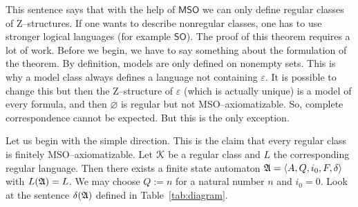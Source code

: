 This sentence says that with the help of $\mathsf{MSO}$ we can only 
define regular classes of Z--structures. If one wants to describe 
nonregular classes, one has to use stronger logical languages (for 
example $\mathsf{SO}$). The proof of this theorem requires a lot of 
work. Before we begin, we have to say something about the formulation
of the theorem. By definition, models are only defined on
nonempty sets. This is why a model class always defines a
language not containing $\varepsilon$. It is possible to change
this but then the Z--structure of $\varepsilon$ (which is
actually unique) is a model of every formula, and then
$\varnothing$ is regular but not MSO--axiomatizable.
So, complete correspondence cannot be expected. But this is the 
only exception.

Let us begin with the simple direction. This is the claim that
every regular class is finitely MSO--axiomatizable. Let $\mathcal{K}$ be 
a regular class and $L$ the corresponding regular language. Then 
there exists a finite state automaton
$\mathfrak{A} = \langle A, Q, i_0, F, \delta\rangle$ with $L(\mathfrak{A}) = L$. We
may choose $Q := n$ for a natural number $n$ and $i_0 = 0$.
Look at the sentence $\delta(\mathfrak{A})$ defined in Table~\ref{tab:diagram}.
